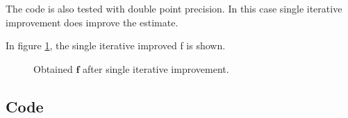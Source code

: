 The code is also tested with double point precision. In this case single iterative improvement does improve the estimate.

In figure \ref{fig:2b_f}, the single iterative improved f is shown.

\begin{figure}[h!]
    \centering
    
    \caption{Obtained $\mathbf{f}$ after single iterative improvement.}
    \label{fig:2b_f}
\end{figure}

\subsection*{Code}




\newpage
